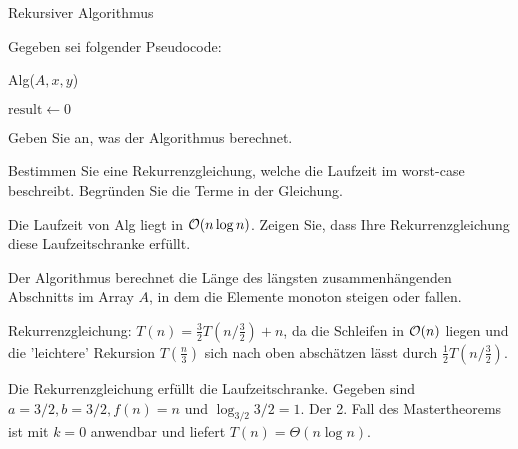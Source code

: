 \documentclass{article}
\begin{document}
\begin{eexercises}{Rekursiver Algorithmus}{
    Gegeben sei folgender Pseudocode:
    \begin{algorithm}[ht]
      \caption{Alg($A,x,y$)}
      $\text{result} \gets 0$ \\
    \end{algorithm}
  }
  \item Geben Sie an, was der Algorithmus berechnet.
  \item Bestimmen Sie eine Rekurrenzgleichung, welche die Laufzeit im worst-case beschreibt. Begründen Sie die Terme in der Gleichung.
  \item Die Laufzeit von Alg liegt in $\mathcal{O}(n \log n)$. Zeigen Sie, dass Ihre Rekurrenzgleichung diese Laufzeitschranke erfüllt.
\end{eexercises}

\begin{solutions}
  \item Der Algorithmus berechnet die Länge des längsten zusammenhängenden Abschnitts im Array $A$, in dem die Elemente monoton steigen oder fallen.
  \item Rekurrenzgleichung: $T(n) = \frac{3}{2}T(n/\frac{3}{2}) + n$, da die Schleifen in $\mathcal{O}(n)$ liegen und die 'leichtere' Rekursion $T(\frac{n}{3})$ sich nach oben abschätzen lässt durch $\frac{1}{2}T(n/\frac{3}{2})$.
  \item Die Rekurrenzgleichung erfüllt die Laufzeitschranke. Gegeben sind $a=3/2, b=3/2, f(n)=n$ und $\log_{3/2}{3/2} = 1$. Der 2. Fall des Mastertheorems ist mit $k=0$ anwendbar und liefert $T(n) = \Theta(n \log n)$.
\end{solutions}
\end{document}
